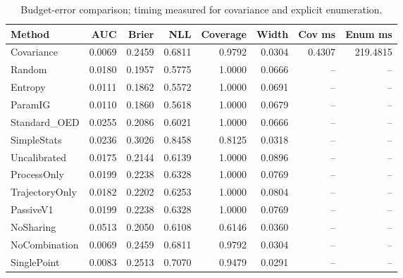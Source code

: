\begin{table}[t]
\caption{Budget-error comparison; timing measured for covariance and explicit enumeration.}
\label{tab:experiment2}
\begin{tabular}{lrrrrrrr}
\toprule
Method & AUC & Brier & NLL & Coverage & Width & Cov ms & Enum ms \\
\midrule
Covariance & 0.0069 & 0.2459 & 0.6811 & 0.9792 & 0.0304 & 0.4307 & 219.4815 \\
Random & 0.0180 & 0.1957 & 0.5775 & 1.0000 & 0.0666 & -- & -- \\
Entropy & 0.0111 & 0.1862 & 0.5572 & 1.0000 & 0.0691 & -- & -- \\
ParamIG & 0.0110 & 0.1860 & 0.5618 & 1.0000 & 0.0679 & -- & -- \\
Standard\_OED & 0.0255 & 0.2086 & 0.6021 & 1.0000 & 0.0666 & -- & -- \\
SimpleStats & 0.0236 & 0.3026 & 0.8458 & 0.8125 & 0.0318 & -- & -- \\
Uncalibrated & 0.0175 & 0.2144 & 0.6139 & 1.0000 & 0.0896 & -- & -- \\
ProcessOnly & 0.0199 & 0.2238 & 0.6328 & 1.0000 & 0.0769 & -- & -- \\
TrajectoryOnly & 0.0182 & 0.2202 & 0.6253 & 1.0000 & 0.0804 & -- & -- \\
PassiveV1 & 0.0199 & 0.2238 & 0.6328 & 1.0000 & 0.0769 & -- & -- \\
NoSharing & 0.0513 & 0.2050 & 0.6108 & 0.6146 & 0.0360 & -- & -- \\
NoCombination & 0.0069 & 0.2459 & 0.6811 & 0.9792 & 0.0304 & -- & -- \\
SinglePoint & 0.0083 & 0.2513 & 0.7070 & 0.9479 & 0.0291 & -- & -- \\
\bottomrule
\end{tabular}
\end{table}
